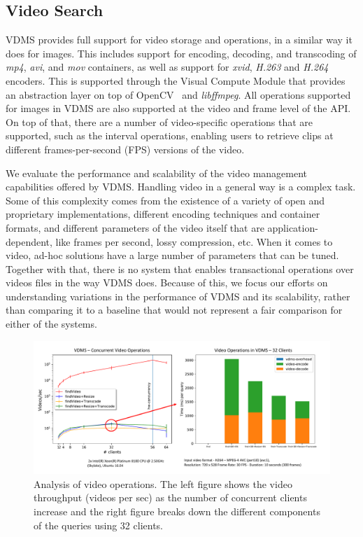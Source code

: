\subsection{Video Search}
\label{videos}

VDMS provides full support for video storage and operations,
in a similar way it does for images.
This includes support for encoding, decoding, and transcoding of
\textit{mp4}, \textit{avi}, and \textit{mov} containers,
as well as support for \textit{xvid}, \textit{H.263} and \textit{H.264} encoders.
This is supported through the Visual Compute Module that provides an abstraction
layer on top of OpenCV~\cite{opencv} and \textit{libffmpeg}\cite{ffmpeg}.
All operations supported for images in VDMS are also supported at the
video and frame level of the API.
On top of that, there are a number of video-specific operations that
are supported, such as the interval operations,
enabling users to retrieve clips at different
frames-per-second (FPS) versions of the video.

We evaluate the performance and scalability of the video management
capabilities offered by VDMS.
Handling video in a general way is a complex task.
Some of this complexity comes from the existence of a variety of open and
proprietary implementations, different encoding techniques and container
formats, and different parameters of the video itself that are
application-dependent, like frames per second, lossy compression, etc.
When it comes to video, ad-hoc solutions have a large number of parameters that
can be tuned.
Together with that, there is no system that enables transactional
operations over videos files in the way VDMS does.
Because of this, we focus our efforts on understanding variations in the
performance of VDMS and its scalability, rather than comparing
it to a baseline that would not represent a fair
comparison for either of the systems.

\begin{figure}[ht!]
\centering
\includegraphics[width=\textwidth]{figures/video_overhead}
\caption{Analysis of video operations. The left figure shows the video throughput (videos per sec) as the number of concurrent clients increase and the right figure breaks down the different components of the
queries using 32 clients.}
\label{fig:video}
\end{figure}

